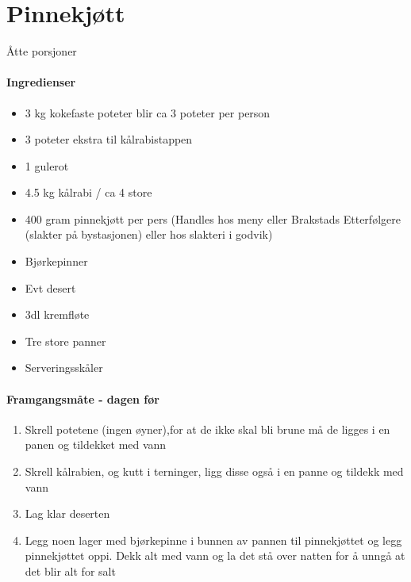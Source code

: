 \section{﻿Pinnekjøtt}
Åtte porsjoner

\paragraph{Ingredienser}
\begin{itemize}[noitemsep]
	\item 3 kg kokefaste poteter blir ca 3 poteter per person
	\item 3 poteter ekstra til kålrabistappen
	\item 1 gulerot
	\item 4.5 kg kålrabi / ca 4 store
	\item 400 gram pinnekjøtt per pers (Handles hos meny eller Brakstads Etterfølgere (slakter på bystasjonen) eller hos slakteri i godvik)
	\item Bjørkepinner
	\item Evt desert
	\item 3dl kremfløte
	\item Tre store panner
	\item Serveringsskåler
\end{itemize}

\paragraph{Framgangsmåte - dagen før}
\begin{enumerate}[noitemsep]
	\item Skrell potetene (ingen øyner),for at de ikke skal bli brune må de ligges i en panen og tildekket med vann
	\item Skrell kålrabien, og kutt i terninger, ligg disse også i en panne og tildekk med vann
	\item Lag klar deserten
	\item Legg noen lager med bjørkepinne i bunnen av pannen til pinnekjøttet og legg pinnekjøttet oppi. Dekk alt med vann og la det stå over natten for å unngå at det blir alt for salt
\end{enumerate}

